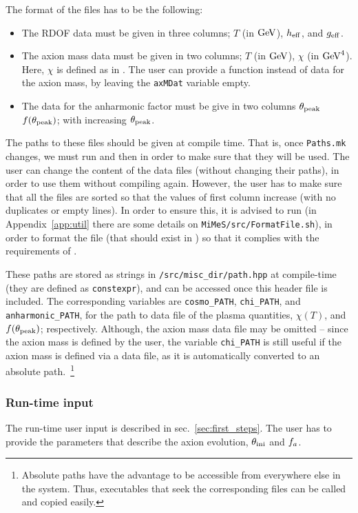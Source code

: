 \documentclass[11pt,a4paper]{article}
\begin{document}
The format of the files has to be the following:
%
\begin{itemize}
	\item The RDOF data must be given in three columns; $T$ (in ${\rm GeV}$), $h_{\rm eff}{}$, and $g_{\rm eff}{}$.
	\item The axion mass data must be given in two columns; $T$ (in ${\rm GeV}$), $\chi$ (in ${\rm GeV}^4$). Here, $\chi$ is defined as in . 
	The user can provide a function instead of data for the axion mass, by leaving the  {\tt axMDat} variable empty. 
	\item The data for the anharmonic factor must be give in two columns   $\theta_{\rm peak}{}$ $f(\theta_{\rm peak}{})$; with increasing $\theta_{\rm peak}{}$.
\end{itemize}
%
The paths to these files should be given at compile time. That is, once {\tt Paths.mk} changes, we must run  and then  in order to make sure that they will be used. The user can change the content of the data files (without changing their paths), in order to use them without compiling \mimes again. However, the user has to make sure that all the files are sorted so that the values of first column increase (with no duplicates or empty lines). In order to ensure this, it is advised to run  (in Appendix~\ref{app:util} there are some details on {\tt MiMeS/src/FormatFile.sh}), in order to format the file (that should exist in ) so that it complies with the requirements of \mimes.

These paths are stored as strings in {\tt \mimes/src/misc\_dir/path.hpp} at compile-time (they are defined as {\tt constexpr}), and can be accessed once this header file is included. The corresponding variables are {\tt cosmo\_PATH}, {\tt chi\_PATH}, and {\tt anharmonic\_PATH}, for the path to data file of the plasma quantities, $\chi(T)$, and $f(\theta_{\rm peak}{})$; respectively. Although, the axion mass data file may be omitted -- since the axion mass is defined by the user, the variable {\tt chi\_PATH} is still useful if the axion mass is defined via a data file, as it is automatically converted to an absolute path.~\footnote{Absolute paths have the advantage to be accessible from everywhere else in the system. Thus, executables that seek the corresponding files can be called and copied easily.}




\subsubsection{Run-time input}\label{sec:run_time_input}
%
The run-time user input is described in sec.~\ref{sec:first_steps}. The user has to provide the parameters that describe the axion evolution, $\theta_{\rm ini}{}$ and $f_{a}{}$. 
\end{document}
